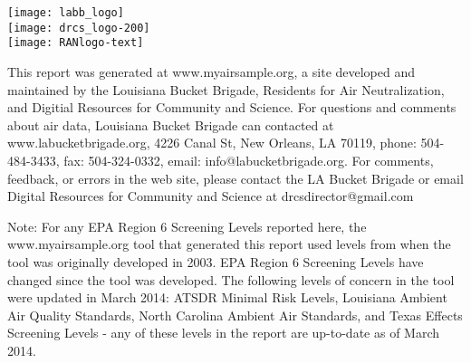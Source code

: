 \documentclass{article}
\newlength\acklength
\newlength\logowidth
\newcommand{\highlightbox}[1]{\colorbox{salmon}{\parbox{\linewidth}{#1}}}
\begin{document}
\newcommand{\standardssection}{
\section*{Sample screening levels}

\highlightbox{Some government agencies have developed standards and screening levels for
toxic chemicals in the air based on health information about the chemicals.
There is no information available for some toxic chemicals. The agencies are
listed below, with a brief description of the methods used in establishing their
levels. States may not be required to adhere to national standards.}

\begin{itemize}
\subst{standardblurbs}
\end{itemize}

}

     \vfill
     \parbox{\logowidth}{
       \texttt{[image: labb\_logo]}\\
       \vskip 0.1in
       \texttt{[image: drcs\_logo-200]}\\
       \vskip 0.1in
       \texttt{[image: RANlogo-text]}
     }
     \setlength\acklength{\textwidth}
     \addtolength\acklength{-\logowidth}
     \addtolength\acklength{-0.7in}
     \hskip 0.5in
     \parbox{\acklength}{
       \sloppy
       This report was generated at www.myairsample.org, a site
       \linebreak
       developed and maintained by the Louisiana Bucket Brigade,
       \linebreak
       Residents for Air Neutralization, and Digitial Resources for
       \linebreak
       Community and Science.  For questions and comments about air
       data, Louisiana Bucket Brigade can contacted at
       www.labucketbrigade.org, 4226 Canal St, New Orleans, LA 70119,
       phone: 504-484-3433, fax: 504-324-0332, email:
       info@labucketbrigade.org.  For comments, feedback, or errors in
       the web site, please contact the LA Bucket Brigade or email
       Digital Resources for Community and Science at
       drcsdirector@gmail.com
     }

\thispagestyle{empty}


\vspace*{0.15in}
      
Note: For any EPA Region 6 Screening Levels reported here, the
www.myairsample.org tool that generated this report used levels from
when the tool was originally developed in 2003.  EPA Region 6
Screening Levels have changed since the tool was developed. The
following levels of concern in the tool were updated in March 2014:
ATSDR Minimal Risk Levels, Louisiana Ambient Air Quality Standards,
North Carolina Ambient Air Standards, and Texas Effects Screening
Levels - any of these levels in the report are up-to-date as of March
2014.

\end{document}
